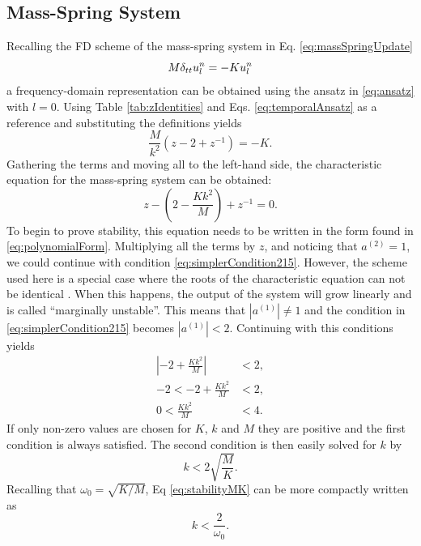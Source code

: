 {{\subsection{Mass-Spring System}\label{sec:massSpringStability}
Recalling the FD scheme of the mass-spring system in Eq. \eqref{eq:massSpringUpdate}
\begin{equation*}
    M \delta_{tt} u_l^n = -K u_l^n
\end{equation*} 
a frequency-domain representation can be obtained using the ansatz in \eqref{eq:ansatz} with $l = 0$. Using Table \ref{tab:zIdentities} and Eqs. \eqref{eq:temporalAnsatz} as a reference and substituting the definitions yields
\begin{equation*}
    \frac{M}{k^2}\left(z -2 +z^{-1}\right) = -K.
\end{equation*}
Gathering the terms and moving all to the left-hand side, the characteristic equation for the mass-spring system can be obtained:
\begin{equation}\label{eq:massSpringCharacteristic}
    z - \left(2-\frac{Kk^2}{M} \right) + z^{-1} = 0. 
\end{equation}
To begin to prove stability, this equation needs to be written in the form found in \eqref{eq:polynomialForm}. Multiplying all the terms by $z$, and noticing that $a^{(2)} = 1$, we could continue with condition \eqref{eq:simplerCondition215}. However, the scheme used here is a special case where the roots of the characteristic equation can not be identical \cite{theBible}. When this happens, the output of the system will grow linearly and is called ``marginally unstable''. This means that $|a^{(1)}|\neq 1$ and the condition in \eqref{eq:simplerCondition215} becomes $|a^{(1)}|<2$. Continuing with this conditions yields
\begin{align*}
    \left|-2+\frac{Kk^2}{M}\right| &< 2,\\
    -2 < -2+\frac{Kk^2}{M} &< 2,\\
    0 < \frac{Kk^2}{M} &< 4.
\end{align*}
If only non-zero values are chosen for $K$, $k$ and $M$ they are positive and the first condition is always satisfied. The second condition is then easily solved for $k$ by
\begin{equation}\label{eq:stabilityMK}
    k < 2\sqrt{\frac{M}{K}}.
\end{equation}
Recalling that $\omega_0 = \sqrt{K/M}$, Eq \eqref{eq:stabilityMK} can be more compactly written as 
\begin{equation}
    k <\frac{2}{\omega_0}.
\end{equation}

}}
